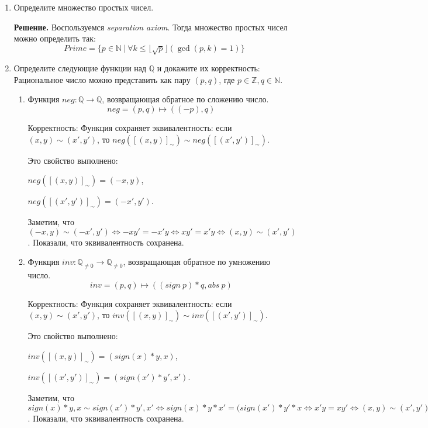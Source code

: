 \begin{enumerate}
\item Определите множество простых чисел.

\textbf{Решение.} Воспользуемся \textit{separation axiom}. Тогда множество простых чисел можно определить так:
\begin{equation*}
	Prime = \{p \in \mathbb{N} \ | \ \forall k \leqslant \lfloor \sqrt{p} \rfloor (\gcd(p, k) = 1) \}
\end{equation*}

\item Определите следующие функции над $\mathbb{Q}$ и докажите их корректность:
Рациональное число можно представить как пару $(p, q)$, где $p \in \mathbb{Z}, q \in \mathbb{N}$. 
\begin{enumerate}
\item Функция $neg : \mathbb{Q} \to \mathbb{Q}$, возвращающая обратное по сложению число.
\begin{equation*}
	neg = (p, q) \mapsto ((-p), q)
\end{equation*}

Корректность: Функция сохраняет эквивалентность: если $(x,y) \sim (x',y')$, то $neg([(x,y)]_\sim) 
\sim neg([(x',y')]_\sim)$. 

Это свойство выполнено: 

$neg([(x,y)]_\sim) = (-x, y)$, 

$neg([(x',y')]_\sim) = (-x', y')$. 

Заметим, что $(-x, y) \sim (-x', y') \Leftrightarrow -xy' = -x'y 
\Leftrightarrow xy' = x'y \Leftrightarrow (x,y) \sim (x',y')$. Показали, что эквивалентность 
сохранена.

\item Функция $inv : \mathbb{Q}_{\neq 0} \to \mathbb{Q}_{\neq 0}$, возвращающая обратное по умножению число.
\begin{equation*}
	inv = (p, q) \mapsto ((sign \ p) * q, abs \ p)
\end{equation*}

Корректность: Функция сохраняет эквивалентность: если $(x,y) \sim (x',y')$, то $inv([(x,y)]_\sim) 
\sim inv([(x',y')]_\sim)$. 

Это свойство выполнено: 

$inv([(x,y)]_\sim) = (sign(x) *y, x)$, 

$inv([(x',y')]_\sim) = (sign(x') * y', x')$. 

Заметим, что $sign(x) *y, x \sim sign(x') * y', x' 
\Leftrightarrow sign(x) * y * x' = (sign(x') * y' * x \Leftrightarrow x'y = xy' \Leftrightarrow (x,y) 
\sim (x',y')$. Показали, что эквивалентность сохранена.


\end{enumerate}
\end{enumerate}
